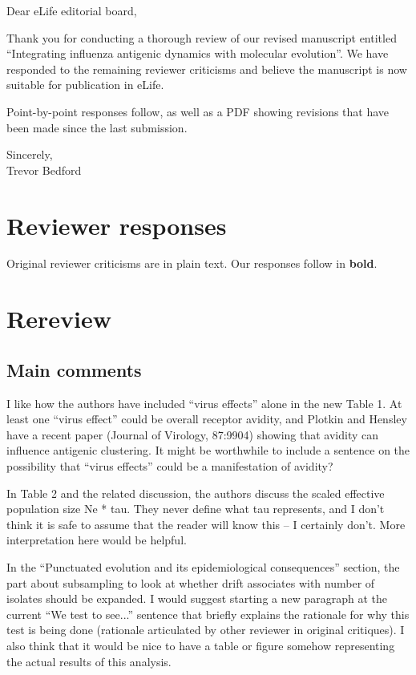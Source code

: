 \documentclass[11pt,oneside,letterpaper]{article}
\begin{document}

Dear eLife editorial board,

Thank you for conducting a thorough review of our revised manuscript entitled ``Integrating influenza antigenic dynamics with molecular evolution''.  We have responded to the remaining reviewer criticisms and believe the manuscript is now suitable for publication in eLife.

Point-by-point responses follow, as well as a PDF showing revisions that have been made since the last submission.

Sincerely,\\
Trevor Bedford

\restoregeometry

\newpage

\section*{Reviewer responses}

Original reviewer criticisms are in plain text.  Our responses follow in \textbf{bold}.  

\section*{Rereview}

\subsection*{Main comments}

I like how the authors have included ``virus effects'' alone in the new Table 1. At least one ``virus effect'' could be overall receptor avidity, and Plotkin and Hensley have a recent paper (Journal of Virology, 87:9904) showing that avidity can influence antigenic clustering. It might be worthwhile to include a sentence on the possibility that ``virus effects'' could be a manifestation of avidity? 

In Table 2 and the related discussion, the authors discuss the scaled effective population size Ne * tau. They never define what tau represents, and I don't think it is safe to assume that the reader will know this -- I certainly don't. More interpretation here would be helpful. 

In the ``Punctuated evolution and its epidemiological consequences'' section, the part about subsampling to look at whether drift associates with number of isolates should be expanded. I would suggest starting a new paragraph at the current ``We test to see...'' sentence that briefly explains the rationale for why this test is being done (rationale articulated by other reviewer in original critiques). I also think that it would be nice to have a table or figure somehow representing the actual results of this analysis. 
\end{document}
